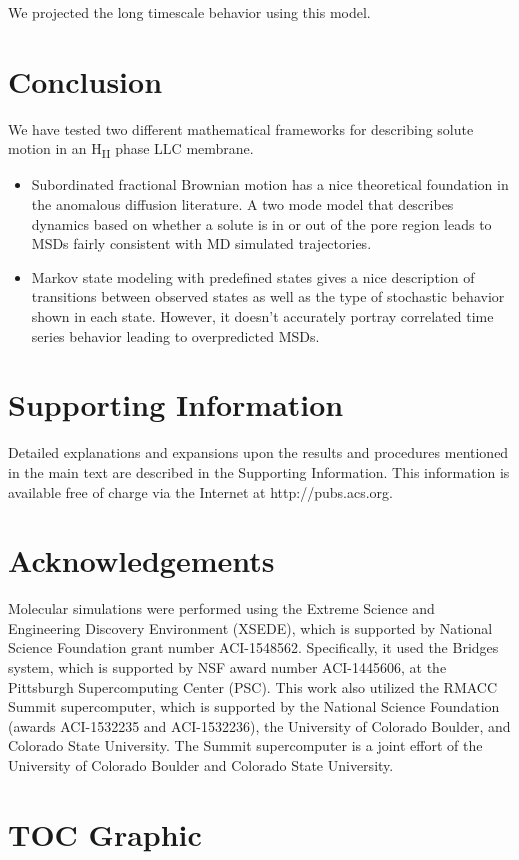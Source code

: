 \documentclass{article}
\begin{document}
  We projected the long timescale behavior using this model. 

  \section{Conclusion}

  
  We have tested two different mathematical frameworks for describing solute
  motion in an H\textsubscript{II} phase LLC membrane.
  \begin{itemize}
    \item Subordinated fractional Brownian motion has a nice theoretical foundation
    in the anomalous diffusion literature. A two mode model that describes dynamics
    based on whether a solute is in or out of the pore region leads to MSDs fairly
    consistent with MD simulated trajectories.
    \item Markov state modeling with predefined states gives a nice description
    of transitions between observed states as well as the type of stochastic 
    behavior shown in each state. However, it doesn't accurately portray correlated
    time series behavior leading to overpredicted MSDs.
  \end{itemize}
  
  \section*{Supporting Information}

  Detailed explanations and expansions upon the results and procedures mentioned in
  the main text are described in the Supporting Information. This information is
  available free of charge via the Internet at http://pubs.acs.org.

  \section*{Acknowledgements}

  Molecular simulations were performed using the Extreme Science and
  Engineering Discovery Environment (XSEDE), which is supported by National
  Science Foundation grant number ACI-1548562. Specifically, it used the Bridges
  system, which is supported by NSF award number ACI-1445606, at the Pittsburgh
  Supercomputing Center (PSC). This work also utilized the RMACC Summit supercomputer,
  which is supported by the National Science Foundation (awards ACI-1532235 and
  ACI-1532236), the University of Colorado Boulder, and Colorado State
  University. The Summit supercomputer is a joint effort of the University of
  Colorado Boulder and Colorado State University.

  \clearpage

  
  

  \newpage

  \section*{TOC Graphic}
\end{document}
